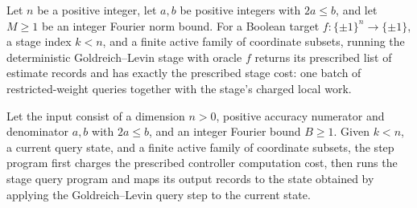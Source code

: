 \begin{theorem}
\label{FABL.DeterministicQueryProgram.runWithCost_deterministicGoldreichLevinStageProgram}
\leanok
{}
Let $n$ be a positive integer, let $a,b$ be positive integers with $2a\le b$, and let
$M\ge1$ be an integer Fourier norm bound. For a Boolean target
$f:\{\pm1\}^n\to\{\pm1\}$, a stage index $k<n$, and a finite active family of coordinate
subsets, running the deterministic Goldreich–Levin stage with oracle $f$ returns its
prescribed list of estimate records and has exactly the prescribed stage cost: one batch
of restricted-weight queries together with the stage’s charged local work.
\end{theorem}

\begin{definition}
\label{FABL.deterministicGoldreichLevinStageStepProgram}
\leanok
{}
Let the input consist of a dimension $n>0$, positive accuracy numerator and denominator
$a,b$ with $2a\le b$, and an integer Fourier bound $B\ge1$. Given $k<n$, a current query
state, and a finite active family of coordinate subsets, the step program first charges
the prescribed controller computation cost, then runs the stage query program and maps
its output records to the state obtained by applying the Goldreich–Levin query step to
the current state.
\end{definition}

